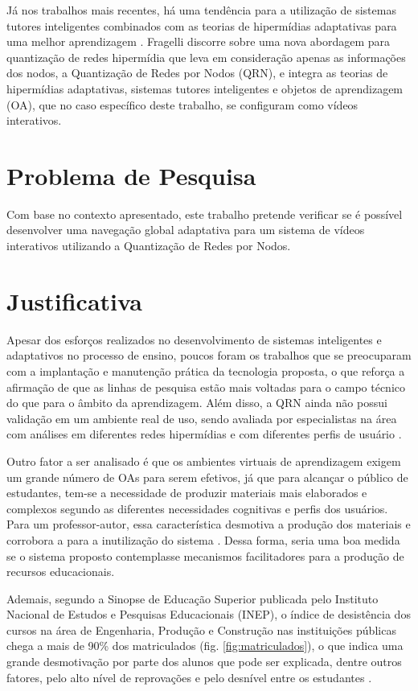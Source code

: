 Já nos trabalhos mais recentes, há uma tendência para a utilização de sistemas tutores inteligentes combinados com as teorias de hipermídias adaptativas para uma melhor aprendizagem \cite{fragelli2010}. Fragelli discorre sobre uma nova abordagem para quantização de redes hipermídia que leva em consideração apenas as informações dos nodos, a Quantização de Redes por Nodos (QRN), e integra as teorias de hipermídias adaptativas, sistemas tutores inteligentes e objetos de aprendizagem (OA), que no caso específico deste trabalho, se configuram como vídeos interativos.

\section[Problema de Pesquisa]{Problema de Pesquisa}

Com base no contexto apresentado, este trabalho pretende verificar se é possível desenvolver uma navegação global adaptativa para um sistema de vídeos interativos utilizando a Quantização de Redes por Nodos.

\section[Justificativa]{Justificativa}

Apesar dos esforços realizados no desenvolvimento de sistemas inteligentes e adaptativos no processo de ensino, poucos foram os trabalhos que se preocuparam com a implantação e manutenção prática da tecnologia proposta, o que reforça a afirmação de que as linhas de pesquisa estão mais voltadas para o campo técnico do que para o âmbito da aprendizagem. Além disso, a QRN ainda não possui validação em um ambiente real de uso, sendo avaliada por especialistas na área com análises em diferentes redes hipermídias e com diferentes perfis de usuário \cite{fragelli2010}.

Outro fator a ser analisado é que os ambientes virtuais de aprendizagem exigem um grande número de OAs para serem efetivos, já que para alcançar o público de estudantes, tem-se a necessidade de produzir materiais mais elaborados e complexos segundo as diferentes necessidades cognitivas e perfis dos usuários. Para um professor-autor, essa característica desmotiva a produção dos materiais e corrobora a para a inutilização do sistema \cite{fragelli2010}. Dessa forma, seria uma boa medida se o sistema proposto contemplasse mecanismos facilitadores para a produção de recursos educacionais.

Ademais, segundo a Sinopse de Educação Superior publicada pelo Instituto Nacional de Estudos e Pesquisas Educacionais (INEP), o índice de desistência dos cursos na área de Engenharia, Produção e Construção nas instituições públicas chega a mais de 90\% dos matriculados (fig.  \ref{fig:matriculados}), o que indica uma grande desmotivação por parte dos alunos que pode ser explicada, dentre outros fatores, pelo alto nível de reprovações e pelo desnível entre os estudantes \cite{silva2005}.

